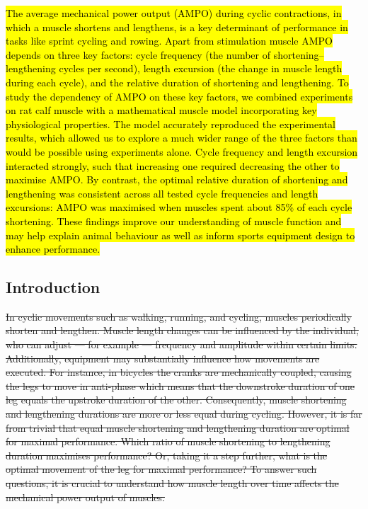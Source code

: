 \documentclass[
  10pt,
  letterpaper,
]{article}
\begin{document}
\hl{The average mechanical power output (AMPO) during cyclic
contractions, in which a muscle shortens and lengthens, is a key
determinant of performance in tasks like sprint cycling and rowing.
Apart from stimulation muscle AMPO depends on three key factors: cycle
frequency (the number of shortening--lengthening cycles per second),
length excursion (the change in muscle length during each cycle), and
the relative duration of shortening and lengthening. To study the
dependency of AMPO on these key factors, we combined experiments on rat
calf muscle with a mathematical muscle model incorporating key
physiological properties. The model accurately reproduced the
experimental results, which allowed us to explore a much wider range of
the three factors than would be possible using experiments alone. Cycle
frequency and length excursion interacted strongly, such that increasing
one required decreasing the other to maximise AMPO. By contrast, the
optimal relative duration of shortening and lengthening was consistent
across all tested cycle frequencies and length excursions: AMPO was
maximised when muscles spent about 85\% of each cycle shortening. These
findings improve our understanding of muscle function and may help
explain animal behaviour as well as inform sports equipment design to
enhance performance.}

\linenumbers

\subsection{Introduction}\label{introduction}

\st{In cyclic movements such as walking, running, and cycling, muscles
periodically shorten and lengthen. Muscle length changes can be
influenced by the individual, who can adjust --- for example ---
frequency and amplitude within certain limits. Additionally, equipment
may substantially influence how movements are executed. For instance, in
bicycles the cranks are mechanically coupled, causing the legs to move
in anti-phase which means that the downstroke duration of one leg equals
the upstroke duration of the other. Consequently, muscle shortening and
lengthening durations are more or less equal during cycling. However, it
is far from trivial that equal muscle shortening and lengthening
duration are optimal for maximal performance. Which ratio of muscle
shortening to lengthening duration maximises performance? Or, taking it
a step further, what is the optimal movement of the leg for maximal
performance? To answer such questions, it is crucial to understand how
muscle length over time affects the mechanical power output of muscles.}
\end{document}
